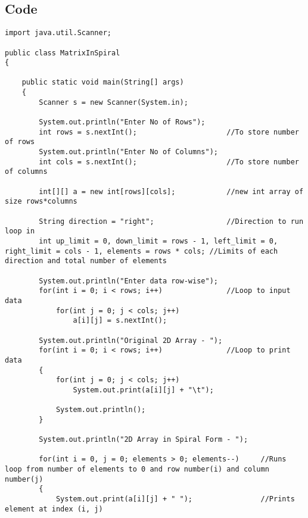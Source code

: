 \documentclass[ProgramminAssignment.tex]{subfiles}
\begin{document}
\subsection{Code}
\begin{lstlisting}
import java.util.Scanner;

public class MatrixInSpiral
{

	public static void main(String[] args)
	{
		Scanner s = new Scanner(System.in);
		
		System.out.println("Enter No of Rows");
		int rows = s.nextInt();						//To store number of rows
		System.out.println("Enter No of Columns");
		int cols = s.nextInt();						//To store number of columns
		
		int[][] a = new int[rows][cols];			//new int array of size rows*columns
		
		String direction = "right";					//Direction to run loop in
		int up_limit = 0, down_limit = rows - 1, left_limit = 0, right_limit = cols - 1, elements = rows * cols; //Limits of each direction and total number of elements
		
		System.out.println("Enter data row-wise");
		for(int i = 0; i < rows; i++)				//Loop to input data
			for(int j = 0; j < cols; j++)
				a[i][j] = s.nextInt();
		
		System.out.println("Original 2D Array - ");
		for(int i = 0; i < rows; i++)				//Loop to print data
		{
			for(int j = 0; j < cols; j++)
				System.out.print(a[i][j] + "\t");
			
			System.out.println();
		}
		
		System.out.println("2D Array in Spiral Form - ");
		
		for(int i = 0, j = 0; elements > 0; elements--)		//Runs loop from number of elements to 0 and row number(i) and column number(j)
		{
			System.out.print(a[i][j] + " ");				//Prints element at index (i, j)
			

\end{lstlisting}
\end{document}
